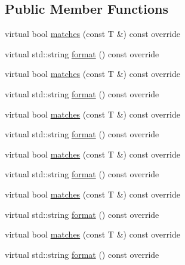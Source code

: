 \subsection*{Public Member Functions}
\begin{DoxyCompactItemize}
\item 
virtual bool \mbox{\hyperlink{structfakeit_1_1internal_1_1TypedAnyMatcher_1_1Matcher_a7a4fb0a098671bd53dd9403169734649}{matches}} (const T \&) const override
\item 
virtual std\+::string \mbox{\hyperlink{structfakeit_1_1internal_1_1TypedAnyMatcher_1_1Matcher_ab992800fe5c4013e40afe8761e24e715}{format}} () const override
\item 
virtual bool \mbox{\hyperlink{structfakeit_1_1internal_1_1TypedAnyMatcher_1_1Matcher_a7a4fb0a098671bd53dd9403169734649}{matches}} (const T \&) const override
\item 
virtual std\+::string \mbox{\hyperlink{structfakeit_1_1internal_1_1TypedAnyMatcher_1_1Matcher_ab992800fe5c4013e40afe8761e24e715}{format}} () const override
\item 
virtual bool \mbox{\hyperlink{structfakeit_1_1internal_1_1TypedAnyMatcher_1_1Matcher_a7a4fb0a098671bd53dd9403169734649}{matches}} (const T \&) const override
\item 
virtual std\+::string \mbox{\hyperlink{structfakeit_1_1internal_1_1TypedAnyMatcher_1_1Matcher_ab992800fe5c4013e40afe8761e24e715}{format}} () const override
\item 
virtual bool \mbox{\hyperlink{structfakeit_1_1internal_1_1TypedAnyMatcher_1_1Matcher_a7a4fb0a098671bd53dd9403169734649}{matches}} (const T \&) const override
\item 
virtual std\+::string \mbox{\hyperlink{structfakeit_1_1internal_1_1TypedAnyMatcher_1_1Matcher_ab992800fe5c4013e40afe8761e24e715}{format}} () const override
\item 
virtual bool \mbox{\hyperlink{structfakeit_1_1internal_1_1TypedAnyMatcher_1_1Matcher_a7a4fb0a098671bd53dd9403169734649}{matches}} (const T \&) const override
\item 
virtual std\+::string \mbox{\hyperlink{structfakeit_1_1internal_1_1TypedAnyMatcher_1_1Matcher_ab992800fe5c4013e40afe8761e24e715}{format}} () const override
\item 
virtual bool \mbox{\hyperlink{structfakeit_1_1internal_1_1TypedAnyMatcher_1_1Matcher_a7a4fb0a098671bd53dd9403169734649}{matches}} (const T \&) const override
\item 
virtual std\+::string \mbox{\hyperlink{structfakeit_1_1internal_1_1TypedAnyMatcher_1_1Matcher_ab992800fe5c4013e40afe8761e24e715}{format}} () const override

\end{DoxyCompactItemize}
